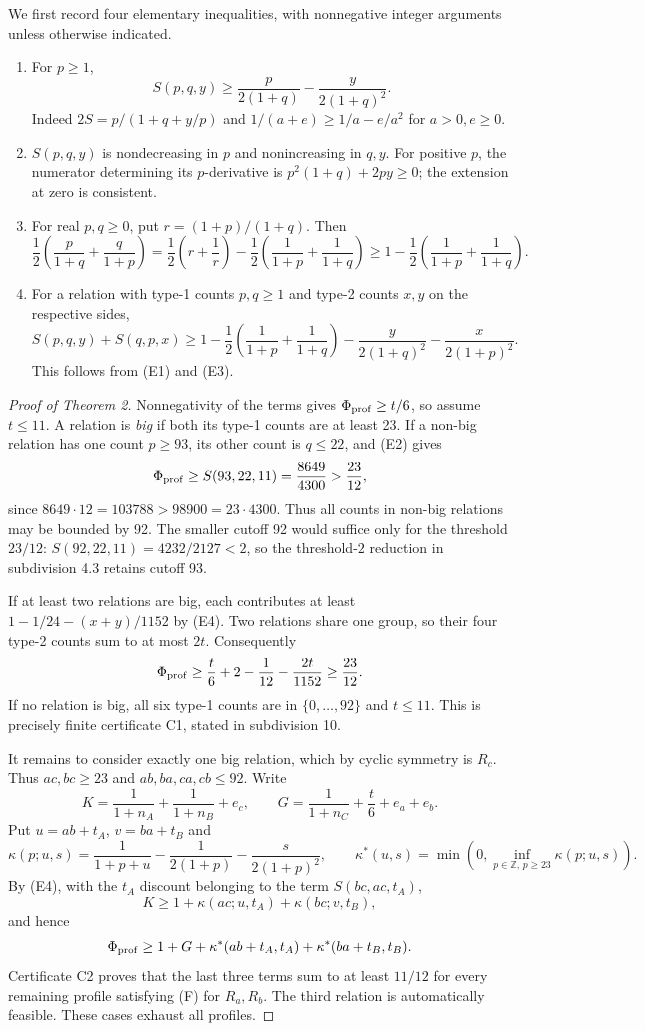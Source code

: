 We first record four elementary inequalities, with nonnegative integer arguments unless otherwise indicated.
\begin{enumerate}
\item[(E1)] For $p\geq1$,
\[
 S(p,q,y)\geq\frac{p}{2(1+q)}-\frac{y}{2(1+q)^2}.
\]
Indeed $2S=p/(1+q+y/p)$ and $1/(a+e)\geq1/a-e/a^2$ for $a>0,e\geq0$.
\item[(E2)] $S(p,q,y)$ is nondecreasing in $p$ and nonincreasing in $q,y$. For positive $p$, the numerator determining its $p$-derivative is $p^2(1+q)+2py\geq0$; the extension at zero is consistent.
\item[(E3)] For real $p,q\geq0$, put $r=(1+p)/(1+q)$. Then
\[
 \frac12\left(\frac p{1+q}+\frac q{1+p}\right)
 =\frac12\left(r+\frac1r\right)-\frac12\left(\frac1{1+p}+\frac1{1+q}\right)
 \geq1-\frac12\left(\frac1{1+p}+\frac1{1+q}\right).
\]
\item[(E4)] For a relation with type-1 counts $p,q\geq1$ and type-2 counts $x,y$ on the respective sides,
\[
 S(p,q,y)+S(q,p,x)\geq1-\frac12\left(\frac1{1+p}+\frac1{1+q}\right)
 -\frac{y}{2(1+q)^2}-\frac{x}{2(1+p)^2}.
\]
This follows from (E1) and (E3).
\end{enumerate}
\begin{proof}[Proof of Theorem 2]
Nonnegativity of the terms gives $\Phi_{\rm prof}\geq t/6$, so assume $t\leq11$. A relation is \emph{big} if both its type-1 counts are at least 23. If a non-big relation has one count $p\geq93$, its other count is $q\leq22$, and (E2) gives
\[
 \Phi_{\rm prof}\geq S(93,22,11)=\frac{8649}{4300}>\frac{23}{12},
\]
since $8649\cdot12=103788>98900=23\cdot4300$. Thus all counts in non-big relations may be bounded by 92. The smaller cutoff 92 would suffice only for the threshold $23/12$: $S(92,22,11)=4232/2127<2$, so the threshold-$2$ reduction in subdivision 4.3 retains cutoff 93.

If at least two relations are big, each contributes at least $1-1/24-(x+y)/1152$ by (E4). Two relations share one group, so their four type-2 counts sum to at most $2t$. Consequently
\[
 \Phi_{\rm prof}\geq\frac t6+2-\frac1{12}-\frac{2t}{1152}\geq\frac{23}{12}.
\]
If no relation is big, all six type-1 counts are in $\{0,\ldots,92\}$ and $t\leq11$. This is precisely finite certificate C1, stated in subdivision 10.

It remains to consider exactly one big relation, which by cyclic symmetry is $R_c$. Thus $ac,bc\geq23$ and $ab,ba,ca,cb\leq92$. Write
\[
 K=\frac1{1+n_A}+\frac1{1+n_B}+e_c,\qquad
 G=\frac1{1+n_C}+\frac t6+e_a+e_b.
\]
Put $u=ab+t_A$, $v=ba+t_B$ and
\[
 \kappa(p;u,s)=\frac1{1+p+u}-\frac1{2(1+p)}-\frac{s}{2(1+p)^2},\qquad
 \kappa^*(u,s)=\min\left(0,\inf_{p\in\mathbb Z,\,p\geq23}\kappa(p;u,s)\right).
\]
By (E4), with the $t_A$ discount belonging to the term $S(bc,ac,t_A)$,
\[
 K\geq1+\kappa(ac;u,t_A)+\kappa(bc;v,t_B),
\]
and hence
\[
 \Phi_{\rm prof}\geq1+G+\kappa^*(ab+t_A,t_A)+\kappa^*(ba+t_B,t_B).
\]
Certificate C2 proves that the last three terms sum to at least $11/12$ for every remaining profile satisfying (F) for $R_a,R_b$. The third relation is automatically feasible. These cases exhaust all profiles.
\end{proof}
